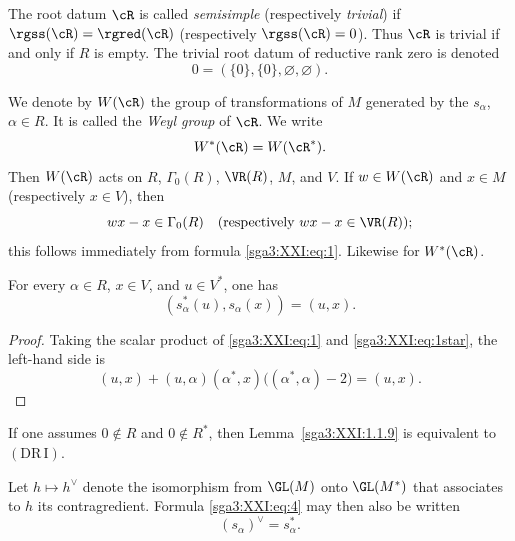 \begin{definition}\label{sga3:XXI:1.1.7}\leavevmode\par
The root datum \(\cR\) is called \emph{semisimple} (respectively
\emph{trivial}) if
\(\rgss(\cR)=\rgred(\cR)\) (respectively \(\rgss(\cR)=0\)).
Thus \(\cR\) is trivial if and only if \(R\) is empty. The trivial root
datum of reductive rank zero is denoted
\[
 0=(\{0\},\{0\},\varnothing,\varnothing).
\]
\end{definition}

\begin{definition}\label{sga3:XXI:1.1.8}
We denote by \(W(\cR)\) the group of transformations of \(M\) generated
by the \(s_\alpha\), \(\alpha\in R\). It is called the \emph{Weyl
group} of \(\cR\). We write
\[
 W^\ast(\cR)=W(\cR^\ast).
\]
Then \(W(\cR)\) acts on \(R\), \(\Gamma_0(R)\), \(\VR(R)\), \(M\),
and \(V\). If \(w\in W(\cR)\) and \(x\in M\) (respectively
\(x\in V\)), then
\[
 wx-x\in\Gamma_0(R)
 \quad\text{(respectively }wx-x\in\VR(R)\text{)};
\]
this follows immediately from formula \eqref{sga3:XXI:eq:1}.
Likewise for \(W^\ast(\cR)\).
\end{definition}

\begin{lemma}\label{sga3:XXI:1.1.9}
For every \(\alpha\in R\), \(x\in V\), and \(u\in V^\ast\), one has
\begin{equation}
 (s_\alpha^\ast(u),s_\alpha(x))=(u,x).
 \tag{4}\label{sga3:XXI:eq:4}
\end{equation}
\end{lemma}

\begin{proof}
Taking the scalar product of \eqref{sga3:XXI:eq:1} and
\eqref{sga3:XXI:eq:1star}, the left-hand side is
\[
 (u,x)+(u,\alpha)(\alpha^\ast,x)
       \bigl((\alpha^\ast,\alpha)-2\bigr)=(u,x).
\]
\end{proof}

\begin{remark}\label{sga3:XXI:1.1.10}
If one assumes \(0\notin R\) and \(0\notin R^\ast\), then
Lemma~\ref{sga3:XXI:1.1.9} is equivalent to
\((\mathrm{DR\,I})\).
\end{remark}

\begin{corollary}\label{sga3:XXI:1.1.11}
Let \(h\mapsto h^\vee\) denote the isomorphism from
\(\GL(M)\) onto \(\GL(M^\ast)\) that associates to \(h\) its
contragredient. Formula \eqref{sga3:XXI:eq:4} may then also be written
\begin{equation}
 (s_\alpha)^\vee=s_\alpha^\ast.
 \tag{5}\label{sga3:XXI:eq:5}
\end{equation}
\end{corollary}

